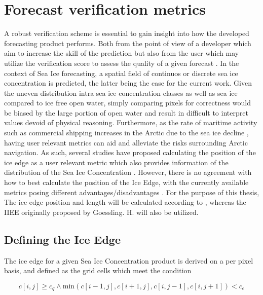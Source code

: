 \documentclass[../main/thesis.tex]{subfiles}
\begin{document}
\section{Forecast verification metrics}
A robust verification scheme is essential to gain insight into how the developed forecasting product performs. Both from the point of view of a  developer which aim to increase the skill of the prediction but also from the user which may utilize the verification score to assess the quality of a given forecast \cite{Casati2008}. In the context of Sea Ice forecasting, a spatial field of continuos or discrete sea ice concentration is predicted, the latter being the case for the current work. Given the uneven distribution intra sea ice concentration classes as well as sea ice compared to ice free open water, simply comparing pixels for correctness would be biased by the large portion of open water and result in difficult to interpret values devoid of physical reasoning.  Furthermore, as the rate of maritime activity such as commercial shipping increases in the Arctic due to the sea ice decline \cite{Ho2010}, having user relevant metrics can aid and alleviate the risks surrounding Arctic navigation. As such, several studies have proposed calculating the position of the ice edge as a user relevant metric which also provides information of the distribution of the Sea Ice Concentration \cite{Dukhovskoy2015,Goessling2016,Goessling2018}. However, there is no agreement with how to best calculate the position of the Ice Edge, with the currently available metrics posing different advantages/disadvantages \cite{Palerme2019,Melsom2019}. For the purpose of this thesis, The ice edge position and length will be calculated according to \cite[Melsom 2019 et.al]{Melsom2019}, whereas the IIEE originally proposed by Goessling. H. \cite{Goessling2016} will also be utilized.

\subsection{Defining the Ice Edge}
\label{sec:iceedgelength}
The ice edge for a given Sea Ice Concentration product is derived on a per pixel basis, and defined as the grid cells which meet the condition

\begin{equation}
    c[i,j] \geq c_q \wedge \text{min}{(c[i-1,j],c[i+1,j],c[i,j-1],c[i,j+1])} < c_e
\end{equation}
\end{document}
